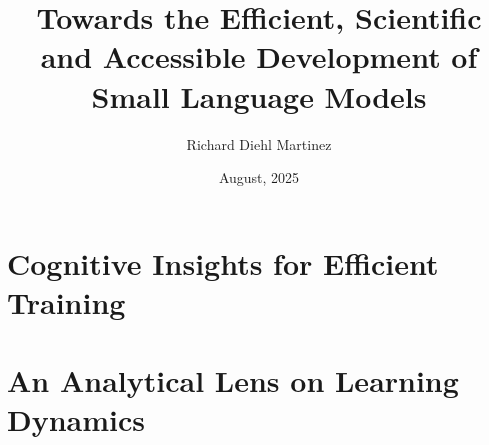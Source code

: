 \documentclass[withindex]{cam-thesis}
\title{Towards the Efficient, Scientific and Accessible Development of Small Language Models}
\author{Richard Diehl Martinez}
\date{August, 2025}
\begin{document}
\frontmatter{}








\part{Cognitive Insights for Eﬀicient Training}








\part{An Analytical Lens on Learning Dynamics}









%

\renewcommand{\bibname}{References}
\cleardoublepage
{}
{}





\appendix


\printthesisindex
\end{document}
